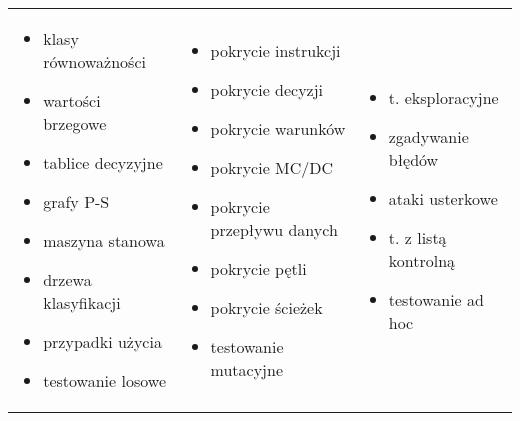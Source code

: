 \documentclass[../main.tex]{subfiles}
\begin{document}
\begin{table}[H]
\begin{center}
\begin{tabular}{ p{5cm} p{5cm} p{5cm} }
                \begin{itemize}
                    \item klasy równoważności
                    \item wartości brzegowe
                    \item tablice decyzyjne
                    \item grafy P-S
                    \item maszyna stanowa
                    \item drzewa klasyfikacji
                    \item przypadki użycia
                    \item testowanie losowe
                \end{itemize}
                &
                \begin{itemize}
                    \item pokrycie instrukcji
                    \item pokrycie decyzji
                    \item pokrycie warunków
                    \item pokrycie MC/DC
                    \item pokrycie przepływu danych
                    \item pokrycie pętli
                    \item pokrycie ścieżek
                    \item testowanie mutacyjne
                \end{itemize}
                &
                \begin{itemize}
                    \item t. eksploracyjne
                    \item zgadywanie błędów
                    \item ataki usterkowe
                    \item t. z listą kontrolną
                    \item testowanie ad hoc
                \end{itemize} \\
            \end{tabular}
        \end{center}
    \end{table}
\end{document}
